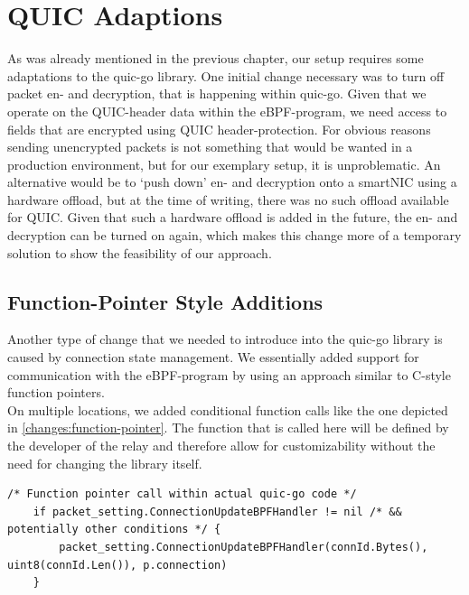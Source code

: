 \section{QUIC Adaptions}\label{sec:quic_adaptions}
As was already mentioned in the previous chapter, our setup requires some adaptations
to the quic-go library.
One initial change necessary was to turn off packet en- and decryption, 
that is happening within quic-go.
Given that we operate on the QUIC-header data within the eBPF-program, we need access 
to fields that are encrypted using QUIC header-protection.
For obvious reasons sending unencrypted packets is not something that would be wanted in 
a production environment, but for our exemplary setup, it is unproblematic. 
An alternative would be to `push down' en- and decryption onto a smartNIC using a 
hardware offload, but at the time of writing, there was no such offload available for QUIC\@. 
Given that such a hardware offload is added in the future, the en- and decryption can be
turned on again, which makes this change more of a temporary solution to show the feasibility
of our approach.

\subsection{Function-Pointer Style Additions}
Another type of change that we needed to introduce into the quic-go library is caused by 
connection state management.
We essentially added support for communication with the eBPF-program by using an 
approach similar to C-style function pointers.
\\
On multiple locations, we added conditional function calls like the one depicted in 
\autoref{changes:function-pointer}.
The function that is called here will be defined by the developer of the relay and 
therefore allow for customizability without the need for changing the library itself.

\vspace{0.5cm}
\noindent\begin{minipage}{\textwidth}
\begin{lstlisting}[style=GoStyle, label=changes:function-pointer, caption=An example of a function-pointer addition to the quic-go library.]
    /* Function pointer call within actual quic-go code */
    if packet_setting.ConnectionUpdateBPFHandler != nil /* && potentially other conditions */ {
	    packet_setting.ConnectionUpdateBPFHandler(connId.Bytes(), uint8(connId.Len()), p.connection)
	}
\end{lstlisting}
\end{minipage}


